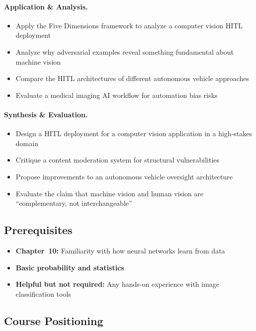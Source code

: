 \paragraph{Application \& Analysis.}
\begin{itemize}
    \item Apply the Five Dimensions framework to analyze a computer vision HITL deployment
    \item Analyze why adversarial examples reveal something fundamental about machine vision
    \item Compare the HITL architectures of different autonomous vehicle approaches
    \item Evaluate a medical imaging AI workflow for automation bias risks
\end{itemize}

\paragraph{Synthesis \& Evaluation.}
\begin{itemize}
    \item Design a HITL deployment for a computer vision application in a high-stakes domain
    \item Critique a content moderation system for structural vulnerabilities
    \item Propose improvements to an autonomous vehicle oversight architecture
    \item Evaluate the claim that machine vision and human vision are ``complementary, not interchangeable''
\end{itemize}

\subsection{Prerequisites}
\begin{itemize}
    \item \textbf{Chapter~10:} Familiarity with how neural networks learn from data
    \item \textbf{Basic probability and statistics}
    \item \textbf{Helpful but not required:} Any hands-on experience with image classification tools
\end{itemize}

\subsection{Course Positioning}

